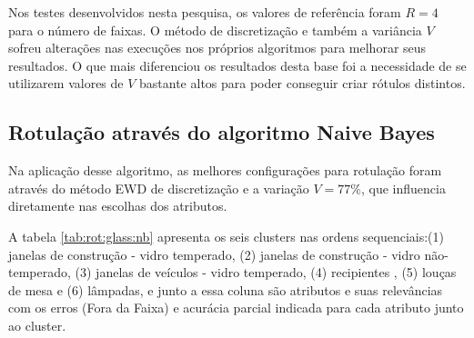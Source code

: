 Nos testes desenvolvidos nesta pesquisa, os valores de referência foram ${R=4}$ para o número de faixas. O método de discretização e também a variância ${V}$ sofreu alterações nas execuções nos próprios algoritmos para melhorar seus resultados. O que mais diferenciou os resultados desta base foi a necessidade de se utilizarem valores de ${V}$ bastante altos para poder conseguir criar rótulos distintos. 

\subsection{Rotulação através do algoritmo Naive Bayes} \label{cap:resultados:ssec:glass:nb}

 

Na aplicação desse algoritmo, as melhores configurações para rotulação foram através do método EWD de discretização e a variação  ${V=77\%}$, que influencia diretamente nas escolhas dos atributos. 

 A tabela \ref{tab:rot:glass:nb}  apresenta os seis clusters nas ordens sequenciais:(1) janelas de construção - vidro temperado, (2) janelas de construção - vidro não-temperado, (3) janelas de veículos - vidro temperado, (4) recipientes , (5) louças de mesa e (6) lâmpadas, e junto a essa coluna são atributos e suas relevâncias com os erros (Fora da Faixa) e acurácia parcial indicada para cada atributo junto ao cluster. 
 

